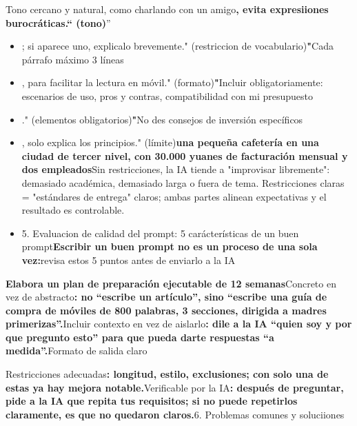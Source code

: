 
Tono cercano y natural, como charlando con un amigo\textbf{, evita expresiiones burocráticas.“ (tono)}”

\booksubsection{(}

\begin{itemize}
  \item ; si aparece uno, explicalo brevemente." (restriccion de vocabulario)\textbf{"}Cada párrafo máximo 3 líneas
  \item , para facilitar la lectura en móvil." (formato)\textbf{"}Incluir obligatoriamente: escenarios de uso, pros y contras, compatibilidad con mi presupuesto
  \item ." (elementos obligatorios)\textbf{"}No des consejos de inversión específicos
  \item , solo explica los principios." (límite)\textbf{una pequeña cafetería en una ciudad de tercer nivel, con 30.000 yuanes de facturación mensual y dos empleados}Sin restricciones, la IA tiende a "improvisar libremente": demasiado académica, demasiado larga o fuera de tema. Restricciones claras = "estándares de entrega" claros; ambas partes alinean expectativas y el resultado es controlable.
  \item 5. Evaluacion de calidad del prompt: 5 carácterísticas de un buen prompt\textbf{Escribir un buen prompt no es un proceso de una sola vez:}revisa estos 5 puntos antes de enviarlo a la IA
\end{itemize}

\textbf{Elabora un plan de preparación ejecutable de 12 semanas}Concreto en vez de abstracto\textbf{: no “escribe un artículo”, sino “escribe una guía de compra de móviles de 800 palabras, 3 secciones, dirigida a madres primerizas”.}Incluir contexto en vez de aislarlo\textbf{: dile a la IA “quien soy y por que pregunto esto” para que pueda darte respuestas “a medida”.}Formato de salida claro


Restricciones adecuadas\textbf{: longitud, estilo, exclusiones; con solo una de estas ya hay mejora notable.}Verificable por la IA\textbf{: después de preguntar, pide a la IA que repita tus requisitos; si no puede repetirlos claramente, es que no quedaron claros.}6. Problemas comunes y soluciiones

\booksubsection{(}

